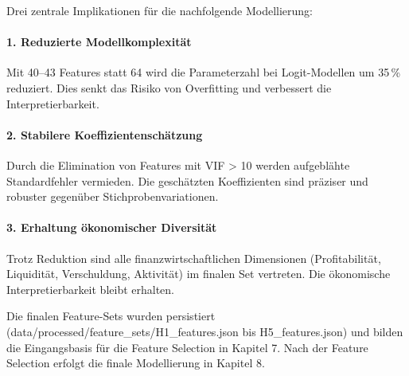 Drei zentrale Implikationen für die nachfolgende Modellierung:

\paragraph{1. Reduzierte Modellkomplexität} Mit 40–43 Features statt 64 wird die Parameterzahl bei Logit-Modellen um 35\,\% reduziert. Dies senkt das Risiko von Overfitting und verbessert die Interpretierbarkeit.

\paragraph{2. Stabilere Koeffizientenschätzung} Durch die Elimination von Features mit VIF > 10 werden aufgeblähte Standardfehler vermieden. Die geschätzten Koeffizienten sind präziser und robuster gegenüber Stichprobenvariationen.

\paragraph{3. Erhaltung ökonomischer Diversität} Trotz Reduktion sind alle finanzwirtschaftlichen Dimensionen (Profitabilität, Liquidität, Verschuldung, Aktivität) im finalen Set vertreten. Die ökonomische Interpretierbarkeit bleibt erhalten.

Die finalen Feature-Sets wurden persistiert (data/processed/feature\_sets/H1\_features.json bis H5\_features.json) und bilden die Eingangsbasis für die Feature Selection in Kapitel 7. Nach der Feature Selection erfolgt die finale Modellierung in Kapitel 8.

